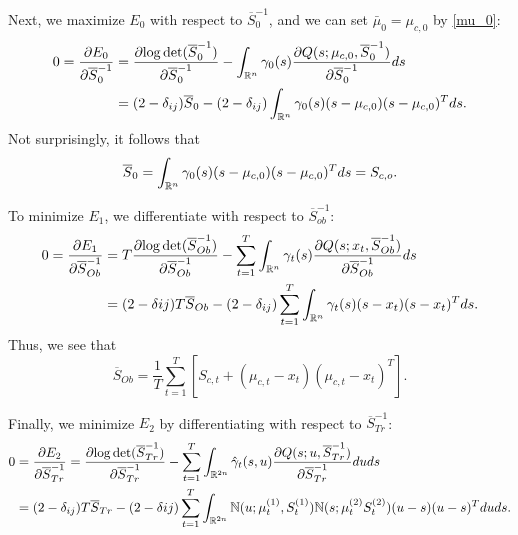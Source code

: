 \documentclass[12pt,leqno]{article}
\begin{document}
Next, we maximize $E_0$ with respect to $\overline{S}_0^{-1}$, and we can set $\bar{\mu}_0 = \mu_{c,0}$ by \eqref{mu_0}:
\begin{align*}
0 = \frac{\partial{E_0}}{\partial{\overline{S}_0^{-1}}} &= \frac{\partial{\log\det(\overline{S}_0^{-1})}}{\partial\overline{S}_0^{-1}} - \int_{{\mathbb R}^n}\gamma_0(s)\frac{\partial{Q(s;\mu_{c,0},\overline{S}_0^{-1})}}{\partial{\overline{S}_0^{-1}}}ds \\
&= (2-\delta_{ij})\overline{S}_0 - (2-\delta_{ij})\int_{{\mathbb R}^n}\gamma_0(s)(s-\mu_{c,0})(s-\mu_{c,0})^Tds.
\end{align*}
Not surprisingly, it follows that
\begin{equation}\label{Sigma_0}
  \overline{S}_0 = \int_{{\mathbb R}^n}\gamma_0(s)(s-\mu_{c,0})(s-\mu_{c,0})^Tds = S_{c,o}.
  \end{equation}

To minimize $E_1$, we differentiate with respect to $\overline{S}_{ob}^{-1}$:
\begin{align*}
  0 = \frac{\partial{E_1}}{\partial{\overline{S}_{Ob}^{-1}}} &= T\frac{\partial{\log\det(\overline{S}_{Ob}^{-1})}}{\partial\overline{S}_{Ob}^{-1}}
  - \sum_{t=1}^T\int_{{\mathbb R}^n}\gamma_t(s)\frac{\partial{Q(s;x_t,\overline{S}_{Ob}^{-1})}}{\partial{\overline{S}_{Ob}^{-1}}}ds \\
  &= (2-\delta{ij})T\overline{S}_{Ob} - (2-\delta_{ij})\sum_{t=1}^T\int_{{\mathbb R}^n}\gamma_t(s)(s-x_t)(s-x_t)^Tds.
\end{align*}
Thus,  we see that
\begin{equation}\label{Sigma_Ob}
  \overline{S}_{Ob} = \frac{1}{T}\sum_{t=1}^T [S_{c,t} + (\mu_{c,t}-x_t)(\mu_{c,t}-x_t)^T].
\end{equation}

Finally, we minimize $E_2$ by differentiating with respect to $\overline{S}_{Tr}^{-1}$:
\begin{equation}\label{Sigma_Tr:0}
  \begin{split}
  0 &= \frac{\partial{E_2}}{\partial{\overline{S}_{Tr}^{-1}}} = \frac{\partial{\log\det(\overline{S}_{Tr}^{-1})}}{\partial\overline{S}_{Tr}^{-1}}
  - \sum_{t=1}^T\int_{{\mathbb R}^{2n}}\hat{\gamma}_t(s,u)\frac{\partial{Q(s;u,\overline{S}_{Tr}^{-1})}}{\partial\overline{S}_{Tr}^{-1}}duds \\
      &= (2-\delta_{ij})T\overline{S}_{Tr} - (2-\delta{ij}) \sum_{t=1}^T\int_{{\mathbb R}^{2n}}{\mathbb N}(u;\mu^{(1)}_t,S^{(1)}_t){\mathbb N}(s;\mu^{(2)}_tS^{(2)}_t)(u-s)(u-s)^Tduds.
  \end{split}
\end{equation}
\end{document}
